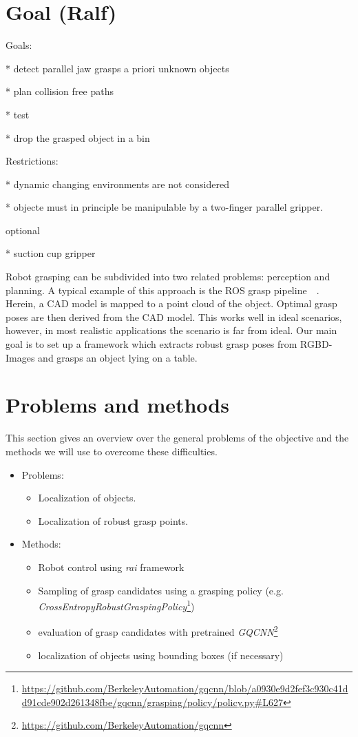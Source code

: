 \documentclass[a4paper]{article}
\begin{document}
\section{Goal (Ralf)} 
\label{2sec_goal}

Goals:

* detect parallel jaw grasps a priori unknown objects

* plan collision free paths 

* test

* drop the grasped object in a bin


Restrictions:

* dynamic changing environments are not considered

* objecte must in principle be manipulable by a two-finger parallel gripper.


optional

* suction cup gripper


Robot grasping can be subdivided into two related problems: perception and planning.
A typical example of this approach is the ROS grasp pipeline~~\cite{chitta_perception_2012}.
Herein, a CAD model is mapped to a point cloud of the object.
Optimal grasp poses are then derived from the CAD model. 
This works well in ideal scenarios, however, in most realistic applications the scenario is far from ideal.
Our main goal is to set up a framework which extracts robust grasp poses from RGBD-Images and grasps an object lying on a table.

\section{Problems and methods}
\label{3sec_prob_n_meth}
This section gives an overview over the general problems of the objective and the methods we will use to overcome these difficulties.


\begin{itemize}
    \item Problems:\\
    \begin{itemize}
        \item Localization of objects.
        \item Localization of robust grasp points.
    \end{itemize}
    \item Methods:\\
    \begin{itemize}
        \item Robot control using \textit{rai} framework
        \item Sampling of grasp candidates using a grasping policy (e.g. \textit{CrossEntropyRobustGraspingPolicy}\footnote{\url{https://github.com/BerkeleyAutomation/gqcnn/blob/a0930e9d2fef3c930c41dd91cde902d261348fbe/gqcnn/grasping/policy/policy.py#L627}}) 
        \item evaluation of grasp candidates with pretrained \textit{GQCNN}\footnote{\url{https://github.com/BerkeleyAutomation/gqcnn}}
        \item localization of objects using bounding boxes (if necessary)
    \end{itemize}
\end{itemize}
\end{document}
